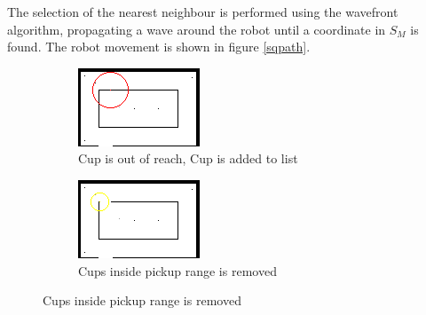 The selection of the nearest neighbour is performed using the wavefront algorithm, propagating
a wave around the robot until a coordinate in \(S_{M}\) is found.
The robot movement is shown in figure \ref{sqpath}.

\begin{figure}[ht]
\centering
  \begin{subfigure}[t]{0.3\textwidth}
    \includegraphics[width = \textwidth]{graphics/sq/room_scan0}
    \caption{Cup is out of reach, Cup is added to list}
    \label{sqroomscan0}
  \end{subfigure}
  \begin{subfigure}[t]{0.3\textwidth}
    \includegraphics[width = \textwidth]{graphics/sq/room_scan1}
    \caption{Cups inside pickup range is removed}
    \label{sqroom_scan1}
  \end{subfigure}
    

\end{figure}
